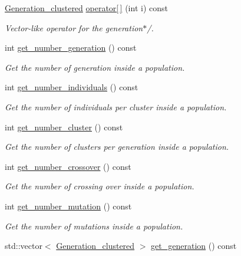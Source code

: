\begin{DoxyCompactItemize}
\hyperlink{class_generation__clustered}{Generation\+\_\+clustered} \hyperlink{class_population__clustered_a147b765cff555d4c3e779bfc44e1a7f7}{operator\mbox{[}$\,$\mbox{]}} (int i) const
\begin{DoxyCompactList}\small\item\em Vector-\/like operator for the generation$\ast$/. \end{DoxyCompactList}\item 
int \hyperlink{class_population__clustered_a91974ba6fab376ce6024ed2d5225104e}{get\+\_\+number\+\_\+generation} () const
\begin{DoxyCompactList}\small\item\em Get the number of generation inside a population. \end{DoxyCompactList}\item 
int \hyperlink{class_population__clustered_ad4fcb9b6b9b5c6f35387a7e2cc745daf}{get\+\_\+number\+\_\+individuals} () const
\begin{DoxyCompactList}\small\item\em Get the number of individuals per cluster inside a population. \end{DoxyCompactList}\item 
int \hyperlink{class_population__clustered_a04e1cd70504458ab365c756931c1670b}{get\+\_\+number\+\_\+cluster} () const
\begin{DoxyCompactList}\small\item\em Get the number of clusters per generation inside a population. \end{DoxyCompactList}\item 
int \hyperlink{class_population__clustered_ae9776425b15b2588d1098de48927925b}{get\+\_\+number\+\_\+crossover} () const
\begin{DoxyCompactList}\small\item\em Get the number of crossing over inside a population. \end{DoxyCompactList}\item 
int \hyperlink{class_population__clustered_a0593be0ca86a2cc3497ba26ffecac82c}{get\+\_\+number\+\_\+mutation} () const
\begin{DoxyCompactList}\small\item\em Get the number of mutations inside a population. \end{DoxyCompactList}\item 
std\+::vector$<$ \hyperlink{class_generation__clustered}{Generation\+\_\+clustered} $>$ \hyperlink{class_population__clustered_ab0c42e75615a2747a11ec999f049eb00}{get\+\_\+generation} () const

\end{DoxyCompactItemize}

